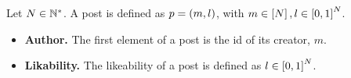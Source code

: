 \begin{definition}[Post]
  Let $N \in \mathbb{N}^*$. A post is defined as $p = \left(m,
  l\right)$, with $m \in \left[N\right], l \in \left[0,
  1\right]^N$.
  \begin{itemize}
    \item \textbf{Author.} The first element of a post is the id of its creator,
    $m$.

    \item \textbf{Likability.} The likeability of a post is defined as
    $l \in \left[0, 1\right]^N$.
  \end{itemize}
\end{definition}
